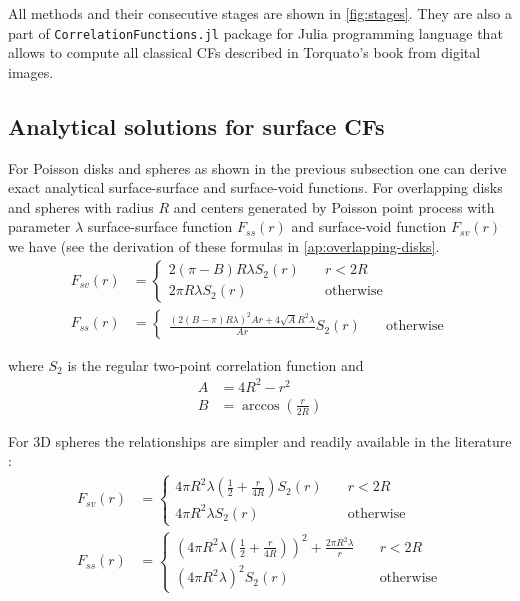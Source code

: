 \documentclass[reprint,amsmath,amssymb,aps,pre]{revtex4-1}
\newcommand{\code}[1]{\colorbox{light-gray}{\texttt{#1}}}
\begin{document}
All methods and their consecutive stages are shown in \cref{fig:stages}. They
are also a part of \code{CorrelationFunctions.jl} package \cite{ourpapaer} for
Julia programming language that allows to compute all classical CFs described in
Torquato’s book \cite{Torq_book} from digital images.

\subsection{Analytical solutions for surface CFs}
For Poisson disks and spheres as shown in the previous subsection one can derive
exact analytical surface-surface and surface-void functions. For overlapping
disks and spheres with radius $R$ and centers generated by Poisson point process
with parameter $\lambda$ surface-surface function $F_{ss}(r)$ and surface-void
function $F_{sv}(r)$ we have (see the derivation of these formulas in
\cref{ap:overlapping-disks}.
\begin{align}
  F_{sv}(r) &= \left\{
  \begin{array}{ll}
    2(\pi - B)R \lambda S_2(r) & \quad r<2R \\
    2\pi R \lambda S_2(r) & \quad \text{otherwise}
  \end{array} \right. \label{eq:fsv_final} \\
  F_{ss}(r) &= \left\{
  \begin{array}{ll}
    \frac{(2(B-\pi)R\lambda)^2Ar + 4\sqrt{A}R^2\lambda}{Ar}S_2(r) & \quad \text{otherwise}
  \end{array} \right. \label{eq:fss_final}
\end{align}

where $S_2$ is the regular two-point correlation function and
\begin{align*}
  A &= 4R^2 - r^2 \\
  B &= \arccos(\frac{r}{2R})
\end{align*}

For 3D spheres the relationships are simpler and readily available in the
literature \cite{Torq_book}\cite{Ma_Torq}:
\begin{align*}
  F_{sv}(r) &= \left\{
  \begin{array}{ll}
    4\pi R^2\lambda(\frac{1}{2} + \frac{r}{4R})S_2(r) & \quad r<2R \\
    4\pi R^2\lambda S_2(r) & \quad \text{otherwise}
  \end{array} \right. \\
  F_{ss}(r) &= \left\{
  \begin{array}{ll}
    {(4\pi R^2 \lambda (\frac{1}{2} + \frac{r}{4R}))^2 + \frac{2\pi R^2 \lambda}{r}} & \quad r<2R \\
    (4\pi R^2 \lambda)^2 S_2(r) & \quad \text{otherwise}
  \end{array} \right.
\end{align*}
\end{document}
